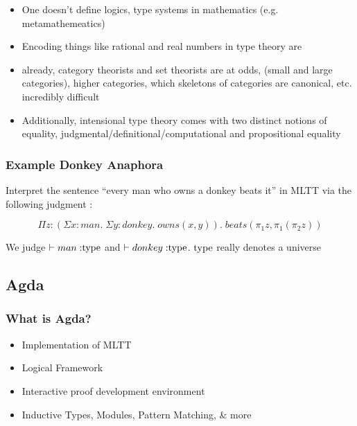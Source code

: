 \documentclass[10pt]{beamer}
\begin{document}
\begin{frame}

\begin{itemize}
\item One doesn't define logics, type systems in mathematics (e.g. metamathemeatics)
\item Encoding things like rational and real numbers in type theory are
\item already, category theorists and set theorists are at odds, (small and
  large categories), higher categories, which skeletons of categories are canonical, etc.
  incredibly difficult
\item Additionally, intensional type theory comes with two distinct notions of
  equality, judgmental/definitional/computational and propositional equality
\end{itemize}  
\end{frame}

\begin{frame}

\frametitle{Example Donkey Anaphora}
  
Interpret the sentence ``every man who owns a donkey beats it'' in MLTT via the following judgment :

\[\Pi z : (\Sigma x : man. \; \Sigma y : donkey. \; owns(x,y)). \;
  beats(\pi_1z,\pi_1(\pi_2z))\] 

We judge $\vdash man \; {:} {\rm type}$ and $\vdash donkey \; {:}
{\rm type}$. ${\rm type}$ really denotes a universe

\end{frame}

\subsection{Agda}

\begin{frame}
\frametitle{What is Agda?}

\begin{itemize}
\item Implementation of MLTT
\item Logical Framework
\item Interactive proof development environment
\item Inductive Types, Modules, Pattern Matching, & more
\end{itemize}

\end{frame}
\end{document}
